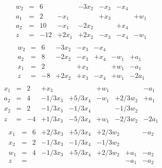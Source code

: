 \documentclass[a4paper,oneside,11pt]{amsart}
\begin{document}
\[
\begin{array}{rcllllll}
w_2 & =  &6 &  &-3x_2 &-x_3 &-x_4 & \\
a_1 & =  &2 &-x_1 &  &+x_3 &  &+w_1\\
a_2 & =  &10 &-x_1 &-2x_2 &  &+x_4 & \\\hline
z &= &-12 &+2x_1 &+2x_2 &-x_3 &-x_4 &-w_1\\
\end{array}
\]
\vspace{1cm}
\[
\begin{array}{rcllllll}
w_2 & =  &6 &-3x_2 &-x_3 &-x_4 &  & \\
a_2 & =  &8 &-2x_2 &-x_3 &+x_4 &-w_1 &+a_1\\
x_1 & =  &2 &  &+x_3 &  &+w_1 &-a_1\\\hline
z &= &-8 &+2x_2 &+x_3 &-x_4 &+w_1 &-2a_1\\
\end{array}
\]
\vspace{1cm}
\[
\begin{array}{rcllllll}
x_1 & =  &2 &+x_3 &  &+w_1 &  &-a_1\\
a_2 & =  &4 &-1/3x_3 &+5/3x_4 &-w_1 &+2/3w_2 &+a_1\\
x_2 & =  &2 &-1/3x_3 &-1/3x_4 &  &-1/3w_2 & \\\hline
z &= &-4 &+1/3x_3 &-5/3x_4 &+w_1 &-2/3w_2 &-2a_1\\
\end{array}
\]
\vspace{1cm}
\[
\begin{array}{rcllllll}
x_1 & =  &6 &+2/3x_3 &+5/3x_4 &+2/3w_2 &  &-a_2\\
x_2 & =  &2 &-1/3x_3 &-1/3x_4 &-1/3w_2 &  & \\
w_1 & =  &4 &-1/3x_3 &+5/3x_4 &+2/3w_2 &+a_1 &-a_2\\\hline
z &= &  &  &  &  &-a_1 &-a_2\\
\end{array}
\]

\newpage
\end{document}
